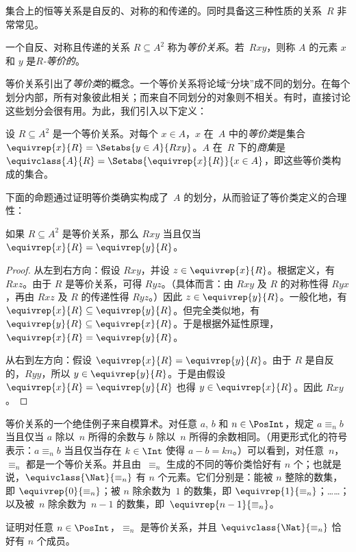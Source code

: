 \documentclass[../../../include/open-logic-section]{subfiles}
\begin{document}


集合上的恒等关系是自反的、对称的和传递的。同时具备这三种性质的关系~$R$ 非常常见。

\begin{defn}[等价关系]
一个自反、对称且传递的关系 $R \subseteq A^2$ 称为\emph{等价关系}。若~$Rxy$，则称 $A$ 的元素 $x$ 和 $y$ 是\emph{$R$-等价的}。
\end{defn}

等价关系引出了\emph{等价类}的概念。一个等价关系将论域“分块”成不同的划分。在每个划分内部，所有对象彼此相关；而来自不同划分的对象则不相关。有时，直接讨论这些划分会很有用。为此，我们引入以下定义：

\begin{defn}
设 $R \subseteq A^2$ 是一个等价关系。对每个 $x \in A$，$x$ 在~$A$ 中的\emph{等价类}是集合 $\equivrep{x}{R}
= \Setabs{y \in A}{Rxy}$。$A$ 在~$R$ 下的\emph{商集}是 $\equivclass{A}{R} = \Setabs{\equivrep{x}{R}}{x \in A}$，即这些等价类构成的集合。
\end{defn}

下面的命题通过证明等价类确实构成了~$A$ 的划分，从而验证了等价类定义的合理性：

\begin{prop}
如果 $R \subseteq A^2$ 是等价关系，那么 $Rxy$ 当且仅当 $\equivrep{x}{R} = \equivrep{y}{R}$。
\end{prop}

\begin{proof}
从左到右方向：假设 $Rxy$，并设 $z \in \equivrep{x}{R}$。根据定义，有 $Rxz$。由于 $R$ 是等价关系，可得 $Ryz$。（具体而言：由 $Rxy$ 及 $R$ 的对称性得 $Ryx$，再由 $Rxz$ 及 $R$ 的传递性得 $Ryz$。）因此 $z \in \equivrep{y}{R}$。一般化地，有 $\equivrep{x}{R} \subseteq \equivrep{y}{R}$。但完全类似地，有 $\equivrep{y}{R} \subseteq \equivrep{x}{R}$。于是根据外延性原理，$\equivrep{x}{R} =
\equivrep{y}{R}$。

从右到左方向：假设 $\equivrep{x}{R} =
\equivrep{y}{R}$。由于 $R$ 是自反的，$Ryy$，所以 $y \in \equivrep{y}{R}$。于是由假设 $\equivrep{x}{R} = \equivrep{y}{R}$ 也得 $y \in \equivrep{x}{R}$。因此 $Rxy$。
\end{proof}

\begin{ex}
等价关系的一个绝佳例子来自模算术。对任意 $a$, $b$ 和 $n \in \PosInt$，规定 $a \equiv_n b$ 当且仅当 $a$ 除以~$n$ 所得的余数与 $b$ 除以~$n$ 所得的余数相同。（用更形式化的符号表示：$a \equiv_n b$ 当且仅当存在 $k \in \Int$ 使得 $a - b = kn$。）可以看到，对任意~$n$，$\equiv_n$ 都是一个等价关系。并且由~$\equiv_n$ 生成的不同的等价类恰好有 $n$ 个；也就是说，$\equivclass{\Nat}{\equiv_n}$ 有 $n$ 个元素。它们分别是：能被 $n$ 整除的数集，即 $\equivrep{0}{\equiv_n}$；被 $n$ 除余数为~$1$ 的数集，即 $\equivrep{1}{\equiv_n}$；……；以及被~$n$ 除余数为~$n-1$ 的数集，即~$\equivrep{n-1}{\equiv_n}$。
\end{ex}

\begin{prob}
证明对任意 $n \in \PosInt$，$\equiv_n$ 是等价关系，并且 $\equivclass{\Nat}{\equiv_n}$ 恰好有 $n$ 个成员。
\end{prob}
\end{document}
